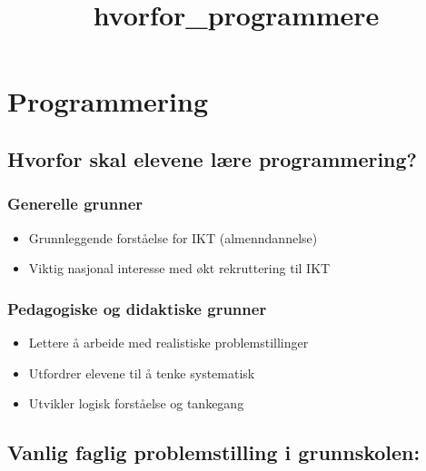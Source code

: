 \documentclass[11pt]{article}
\title{hvorfor\_programmere}
\providecommand{\tightlist}{%
      \setlength{\itemsep}{0pt}\setlength{\parskip}{0pt}}
\begin{document}
    
    \maketitle
    
    

    
    \hypertarget{programmering}{%
\section{Programmering}\label{programmering}}

    \hypertarget{hvorfor-skal-elevene-luxe6re-programmering}{%
\subsection{Hvorfor skal elevene lære
programmering?}\label{hvorfor-skal-elevene-luxe6re-programmering}}

\hypertarget{generelle-grunner}{%
\subsubsection{Generelle grunner}\label{generelle-grunner}}

\begin{itemize}
\tightlist
\item
  Grunnleggende forståelse for IKT (almenndannelse)
\item
  Viktig nasjonal interesse med økt rekruttering til IKT
\end{itemize}

    \hypertarget{pedagogiske-og-didaktiske-grunner}{%
\subsubsection{Pedagogiske og didaktiske
grunner}\label{pedagogiske-og-didaktiske-grunner}}

\begin{itemize}
\tightlist
\item
  Lettere å arbeide med realistiske problemstillinger
\item
  Utfordrer elevene til å tenke systematisk
\item
  Utvikler logisk forståelse og tankegang
\end{itemize}

    \hypertarget{vanlig-faglig-problemstilling-i-grunnskolen}{%
\subsection{Vanlig faglig problemstilling i
grunnskolen:}\label{vanlig-faglig-problemstilling-i-grunnskolen}}
\end{document}
